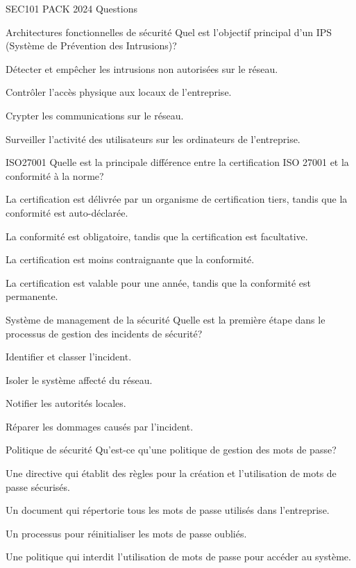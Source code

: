 \documentclass[12pt]{article}
\begin{document}
\begin{quiz}{SEC101 PACK 2024 Questions}
\begin{multi}[points=1]{Architectures fonctionnelles de sécurité}
Quel est l'objectif principal d'un IPS (Système de Prévention des Intrusions)?
\item* Détecter et empêcher les intrusions non autorisées sur le réseau.
\item Contrôler l'accès physique aux locaux de l'entreprise.
\item Crypter les communications sur le réseau.
\item Surveiller l'activité des utilisateurs sur les ordinateurs de l'entreprise.
\end{multi}

\begin{multi}[points=1]{ISO27001}
Quelle est la principale différence entre la certification ISO 27001 et la conformité à la norme?
\item* La certification est délivrée par un organisme de certification tiers, tandis que la conformité est auto-déclarée.
\item La conformité est obligatoire, tandis que la certification est facultative.
\item La certification est moins contraignante que la conformité.
\item La certification est valable pour une année, tandis que la conformité est permanente.
\end{multi}

\begin{multi}[points=1]{Système de management de la sécurité}
Quelle est la première étape dans le processus de gestion des incidents de sécurité?
\item* Identifier et classer l'incident.
\item Isoler le système affecté du réseau.
\item Notifier les autorités locales.
\item Réparer les dommages causés par l'incident.
\end{multi}

\begin{multi}[points=1]{Politique de sécurité}
Qu'est-ce qu'une politique de gestion des mots de passe?
\item* Une directive qui établit des règles pour la création et l'utilisation de mots de passe sécurisés.
\item Un document qui répertorie tous les mots de passe utilisés dans l'entreprise.
\item Un processus pour réinitialiser les mots de passe oubliés.
\item Une politique qui interdit l'utilisation de mots de passe pour accéder au système.
\end{multi}


\end{quiz}
\end{document}
